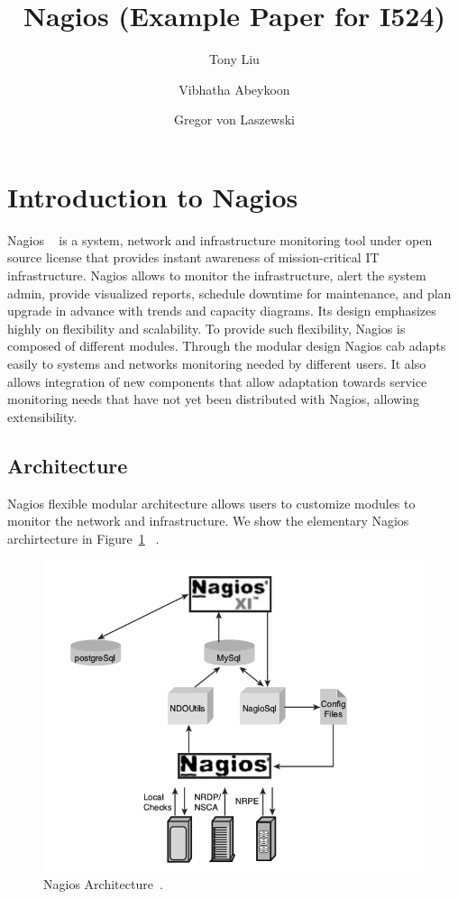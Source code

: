 \documentclass[9pt,twocolumn,twoside]{styles/osajnl}
\title{\centering%
Nagios (Example Paper for I524)}
\author[1]{Tony Liu}
\author[1]{Vibhatha Abeykoon}
\author[1]{Gregor von Laszewski}
\affil[1]{School of Informatics and Computing, Bloomington, IN 47408, U.S.A.}
\begin{document}
\maketitle

\section{Introduction to Nagios}

Nagios ~\cite{www-nagios, wiki-nagios} is a system, network and
infrastructure monitoring tool under open source license that provides
instant awareness of mission-critical IT infrastructure. Nagios allows
to monitor the infrastructure, alert the system admin, provide
visualized reports, schedule downtime for maintenance, and plan
upgrade in advance with trends and capacity diagrams. Its design
emphasizes highly on flexibility and scalability. To provide such
flexibility, Nagios is composed of different modules. Through the
modular design Nagios cab adapts easily to systems and networks
monitoring needed by different users. It also allows integration of new
components that allow adaptation towards service monitoring needs that
have not yet been distributed with Nagios, allowing extensibility.

\subsection{Architecture}

Nagios \cite{nagios-paper-2012} flexible modular architecture allows
users to customize modules to monitor the network and
infrastructure. We show the elementary Nagios archirtecture in
Figure~\ref{fig:Nagios-architecture} ~\cite{nagios-book}.

\begin{figure}[htb]
\centering
\includegraphics[width=\columnwidth]{images/nagios-architecture}
\caption{Nagios Architecture~\cite{nagios-book}.}
\label{fig:Nagios-architecture}
\end{figure}
\end{document}
